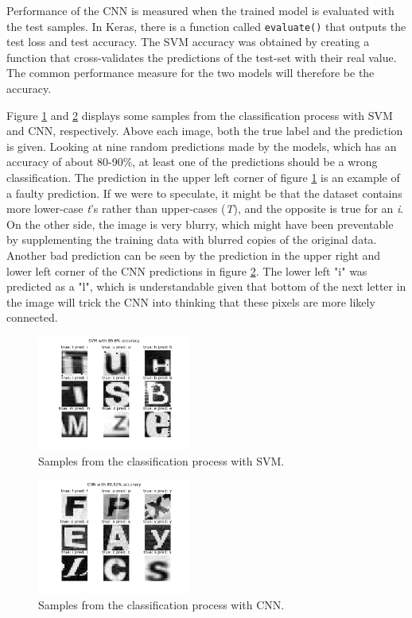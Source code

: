 Performance of the CNN is measured when the trained model is evaluated with the test samples. In Keras, there is a function called \verb|evaluate()| that outputs the test loss and test accuracy. The SVM accuracy was obtained by creating a function that cross-validates the predictions of the test-set with their real value. The common performance measure for the two models will therefore be the accuracy.

Figure \ref{fig:accSVM} and \ref{fig:accCNN} displays some samples from the classification process with SVM and CNN, respectively. Above each image, both the true label and the prediction is given. Looking at nine random predictions made by the models, which has an accuracy of about 80-90\%, at least one of the predictions should be a wrong classification. The prediction in the upper left corner of figure \ref{fig:accSVM} is an example of a faulty prediction. If we were to speculate, it might be that the dataset contains more lower-case \textit{t}'s rather than upper-cases (\textit{T}), and the opposite is true for an \textit{i}. On the other side, the image is very blurry, which might have been preventable by supplementing the training data with blurred copies of the original data. Another bad prediction can be seen by the prediction in the upper right and lower left corner of the CNN predictions in figure \ref{fig:accCNN}. The lower left "i" was predicted as a "l", which is understandable given that bottom of the next letter in the image will trick the CNN into thinking that these pixels are more likely connected.

\begin{figure}[H]
    \centering
    \includegraphics[width=0.45\textwidth]{pictures/accSVM.png}
    \caption{Samples from the classification process with SVM.}
    \label{fig:accSVM}
\end{figure}

\begin{figure}[H]
    \centering
    \includegraphics[width=0.45\textwidth]{pictures/accCNN.png}
    \caption{Samples from the classification process with CNN.}
    \label{fig:accCNN}
\end{figure}

